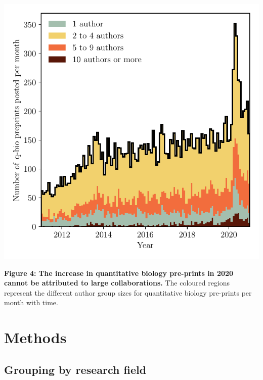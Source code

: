 \documentclass[a4paper,12pt]{article}
\begin{document}
\begin{center}
     \includegraphics[width=\linewidth]{q-bio-pre-prints-segmented-by-author-count}
\end{center}

\noindent \textbf{Figure 4:} \textbf{The increase in quantitative biology pre-prints in 2020 cannot be attributed to large collaborations.} The coloured regions represent the different author group sizes for quantitative biology pre-prints per month with time.


\newpage




\section*{Methods}

\subsection*{Grouping by research field}
\end{document}

